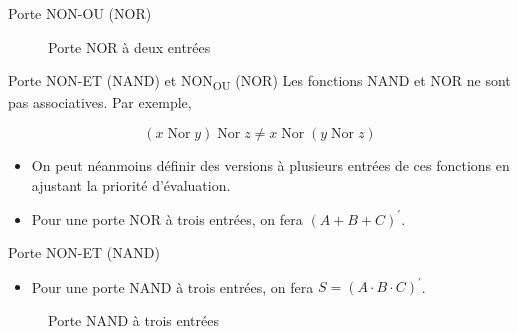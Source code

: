 \documentclass[presentation]{beamer}
\begin{document}
\begin{frame}[label={sec:org1b4fa49}]{Porte NON-OU (NOR)}
\begin{figure}[htbp]
\centering

\caption{\label{fig:orgd9e1b85}Porte NOR à deux entrées}
\end{figure}
\end{frame}

\begin{frame}[label={sec:org99b0174}]{Porte NON-ET (NAND) et NON\textsubscript{OU} (NOR)}
Les fonctions NAND et NOR ne sont pas associatives. Par exemple,

$$
(x \operatorname{Nor} y) \operatorname{Nor} z \neq x \operatorname{Nor} (y \operatorname{Nor} z) 
$$

\begin{itemize}
\item On peut néanmoins définir des versions à plusieurs entrées de ces fonctions en ajustant la priorité d'évaluation.

\item Pour une porte NOR à trois entrées, on fera \((A + B + C)^\prime\).
\end{itemize}
\end{frame}

\begin{frame}[label={sec:org96d8802}]{Porte NON-ET (NAND)}
\begin{itemize}
\item Pour une porte NAND à trois entrées, on fera \(S = (A \cdot B \cdot C)^\prime\).
\end{itemize}

\begin{figure}[htbp]
\centering

\caption{\label{fig:org01270d3}Porte NAND à trois entrées}
\end{figure}
\end{frame}
\end{document}
